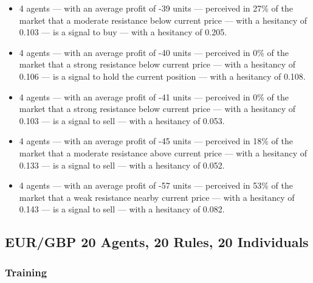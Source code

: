 {\small
  \begin{itemize}
  \item 4 agents — with an average profit of -39 units — perceived in 27\% of the market that a moderate resistance below current price — with a hesitancy of 0.103 — is a signal to buy — with a hesitancy of 0.205.
  \item 4 agents — with an average profit of -40 units — perceived in 0\% of the market that a strong resistance below current price — with a hesitancy of 0.106 — is a signal to hold the current position — with a hesitancy of 0.108.
  \item 4 agents — with an average profit of -41 units — perceived in 0\% of the market that a strong resistance below current price — with a hesitancy of 0.103 — is a signal to sell — with a hesitancy of 0.053.
  \item 4 agents — with an average profit of -45 units — perceived in 18\% of the market that a moderate resistance above current price — with a hesitancy of 0.133 — is a signal to sell — with a hesitancy of 0.052.
  \item 4 agents — with an average profit of -57 units — perceived in 53\% of the market that a weak resistance nearby current price — with a hesitancy of 0.143 — is a signal to sell — with a hesitancy of 0.082.
  \end{itemize}
}

\subsection{EUR/GBP 20 Agents, 20 Rules, 20 Individuals}
\label{}

\subsubsection{Training}
\label{}


